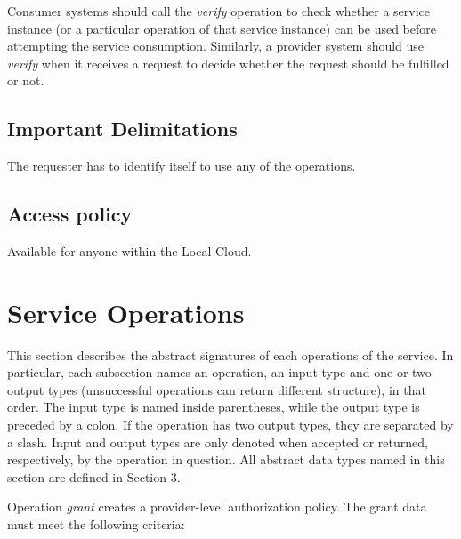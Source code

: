 \documentclass[a4paper]{arrowhead}
\begin{document}
Consumer systems should call the \textit{verify} operation to check whether a service instance (or a particular operation of that service instance) can be used before attempting the service consumption. Similarly, a provider system should use \textit{verify} when it receives a request to decide whether the request should be fulfilled or not.

\subsection{Important Delimitations}
\label{sec:delimitations}

The requester has to identify itself to use any of the operations.

\subsection{Access policy}
\label{sec:accesspolicy}

Available for anyone within the Local Cloud.

\newpage

\section{Service Operations}
\label{sec:functions}

This section describes the abstract signatures of each operations of the service. In particular, each subsection names an operation, an input type and one or two output types (unsuccessful operations can return different structure), in that order.
The input type is named inside parentheses, while the output type is preceded by a colon. If the operation has two output types, they are separated by a slash.
Input and output types are only denoted when accepted or returned, respectively, by the operation in question. All abstract data types named in this section are defined in Section 3.

{}

Operation \textit{grant} creates a provider-level authorization policy. The grant data must meet the following criteria:
\end{document}
